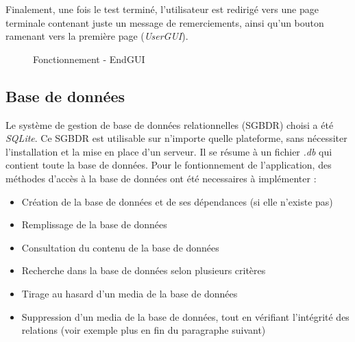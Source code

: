 Finalement, une fois le test terminé, l'utilisateur est redirigé vers une page terminale contenant juste un message de remerciements, ainsi qu'un bouton ramenant vers la première page (\textit{UserGUI}).

\begin{figure}[!ht]
\begin{center}
  \caption{Fonctionnement - EndGUI}
  \label{endGUI} 
\end{center}
\end{figure}

\subsection{Base de données}\label{BDD}

Le système de gestion de base de données relationnelles (SGBDR) choisi a été \textit{SQLite}. Ce SGBDR est utilisable sur n'importe quelle plateforme, sans nécessiter l'installation et la mise en place d'un serveur. Il se résume à un fichier \textit{.db} qui contient toute la base de données.
Pour le fontionnement de l'application, des méthodes d'accès à la base de données ont été necessaires à implémenter :


\begin{itemize}
 \item Création de la base de données et de ses dépendances (si elle n'existe pas)
 \item Remplissage de la base de données
 \item Consultation du contenu de la base de données
 \item Recherche dans la base de données selon plusieurs critères
 \item Tirage au hasard d'un media de la base de données
 \item Suppression d'un media de la base de données, tout en vérifiant l'intégrité des relations (voir exemple plus en fin du paragraphe suivant)
\end{itemize}


